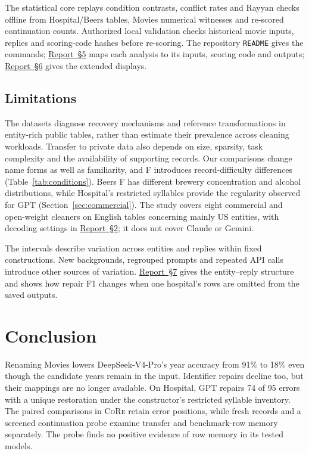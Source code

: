 \documentclass[sigconf, nonacm]{acmart}
\newcommand{\core}{\textsc{CoRe}}
\newcommand{\companionref}[1]{\href{https://github.com/hinsonver/CoRe-Benchmark/raw/refs/heads/main/paper/CoRe-Supplementary-Technical-Report.pdf\#nameddest=companion-#1}{Report~\S#1}}
\begin{document}
The statistical core replays condition contrasts, conflict rates and Rayyan checks offline from
Hospital/Beers tables, Movies numerical witnesses and re-scored continuation counts.
Authorized local validation checks historical movie inputs, replies and scoring-code hashes
before re-scoring. The repository \texttt{README} gives the commands;
\companionref{5} maps each analysis to its inputs, scoring code and outputs;
\companionref{6} gives the extended displays.

\subsection{Limitations}\label{sec:limitations}

The datasets diagnose recovery mechanisms and reference transformations in entity-rich public
tables, rather than estimate their prevalence across cleaning workloads. Transfer to private data
also depends on size, sparsity, task complexity and the availability of supporting records.
Our comparisons change name forms as well as familiarity,
and F introduces record-difficulty differences (Table~\ref{tab:conditions}). Beers F has
different brewery concentration and alcohol distributions, while Hospital's restricted syllables
provide the regularity observed for GPT (Section~\ref{sec:commercial}). The study covers eight
commercial and open-weight cleaners on English tables concerning mainly US entities, with
decoding settings in \companionref{2}; it does not cover Claude or Gemini.

The intervals describe variation across entities and replies within fixed constructions.
New backgrounds, regrouped prompts and repeated API calls introduce other sources of variation.
\companionref{7} gives the entity--reply structure and shows how repair F1 changes when one
hospital's rows are omitted from the saved outputs.

\section{Conclusion}\label{sec:conclusion}

Renaming Movies lowers DeepSeek-V4-Pro's year accuracy from 91\% to 18\% even though the
candidate years remain in the input. Identifier repairs decline too, but their mappings are
no longer available. On Hospital, GPT repairs 74 of 95 errors with a unique restoration under
the constructor's restricted syllable inventory. The paired comparisons in \core{} retain
error positions, while fresh records
and a screened continuation probe examine transfer and benchmark-row memory separately.
The probe finds no positive evidence of row memory in its tested models.
\end{document}
